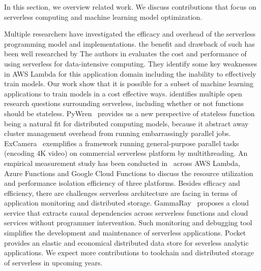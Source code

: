 In this section, we overview related work. We discuss contributions that focus
on serverless computing and machine learning model optimization. 

Multiple researchers have investigated the efficacy and overhead of the
serverless programming model and implementations.
the benefit and drawback of such has been well researched by
The authors in \cite{ref:onesteptwostep} evaluates the cost and performance of using
serverless for data-intensive computing.  They identify some key weaknesses in AWS
Lambda for this application domain including the inability to effectively train models.
Our work show that it is possible for a subset of machine learning applications to 
train models in a cost effective ways.
\cite{ref:baldini2017} identifies multiple open research questions surrounding serverless,
including whether or not functions should be stateless. PyWren~\cite{ref:jonas2017occupy} provides us 
a new perspective of stateless function being a natural fit for distributed computing models, because it 
abstract away cluster management overhead from running embarrassingly parallel jobs. ExCamera~\cite{ref:encoding}
 exemplifies a framework running general-purpose parallel tasks (encoding 4K video) on commercial serverless platform 
by multithreading. An empirical measurement study has been conducted in~\cite{ref:peeking} across AWS Lambda, 
Azure Functions and Google Cloud Functions to discuss the resource utilization and performance isolation efficiency of 
three platforms. Besides efficacy and efficiency, there are challenges serverless architecture are facing in terms of 
application monitoring and distributed storage. GammaRay~\cite{ref:lin2018tracking} proposes a cloud service that extracts
causal dependencies across serverless functions and cloud services without programmer intervention. Such monitoring and 
debugging tool simplifies the development and maintenance of serverless applications. Pocket~\cite{ref:ephemeral} provides 
an elastic and economical distributed data store for severless analytic applications. We expect more contributions to toolchain 
and distributed storage of serverless in upcoming years.


